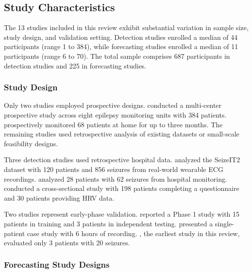 \subsection{Study Characteristics}

The 13 studies included in this review exhibit substantial variation in sample size, study design, and validation setting. Detection studies enrolled a median of 44 participants (range 1 to 384), while forecasting studies enrolled a median of 11 participants (range 6 to 70). The total sample comprises 687 participants in detection studies and 225 in forecasting studies.

\subsubsection{Study Design}

Only two studies employed prospective designs. \textcite{spahrDeepLearningbasedDetection2025} conducted a multi-center prospective study across eight epilepsy monitoring units with 384 patients. \textcite{dongTwoLayerEnsembleMethod2022} prospectively monitored 68 patients at home for up to three months. The remaining studies used retrospective analysis of existing datasets or small-scale feasibility designs.

Three detection studies used retrospective hospital data. \textcite{reintjesECGBasedDetectionEpileptic2025} analyzed the SeizeIT2 dataset with 120 patients and 856 seizures from real-world wearable ECG recordings. \textcite{wangDevelopmentWearableSeizure2025} analyzed 28 patients with 62 seizures from hospital monitoring. \textcite{elemamAutomatedValidatedTool2025} conducted a cross-sectional study with 198 patients completing a questionnaire and 30 patients providing HRV data.

Two studies represent early-phase validation. \textcite{fineWearableDeviceSeizure2025} reported a Phase 1 study with 15 patients in training and 3 patients in independent testing. \textcite{singhRathoreWearableBasedEpileptic2024} presented a single-patient case study with 6 hours of recording. \textcite{borujenyDetectionEpilepticSeizure2013}, the earliest study in this review, evaluated only 3 patients with 20 seizures.

\subsubsection{Forecasting Study Designs}

